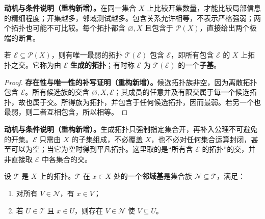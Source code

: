 \documentclass[../../main.tex]{subfiles}%
\begin{document}
\begin{remark}
\textbf{动机与条件说明（重构新增）。}在同一集合 $X$ 上比较开集数量，才能比较局部信息的精细程度；开集越多，邻域测试越多。包含关系允许相等，不表示严格强弱；两个拓扑也可能不可比较。每个拓扑都含 $\varnothing,X$ 且包含于 $\mathscr P(X)$，直接给出两个极端的断言。
\end{remark}
\begin{definition}[生成拓扑与子基]\label{definition:ch04-generated-topology}
若 $\mathcal E\subseteq\mathscr P(X)$，则有唯一最弱的拓扑 $\mathcal T(\mathcal E)$ 包含 $\mathcal E$，即所有包含 $\mathcal E$ 的 $X$ 上拓扑之交。它称为由 $\mathcal E$ \textbf{生成的拓扑}；有时称 $\mathcal E$ 为 $\mathcal T(\mathcal E)$ 的一个\textbf{子基}。
\end{definition}
\begin{proof}
\textbf{存在性与唯一性的补写证明（重构新增）。}候选拓扑族非空，因为离散拓扑包含 $\mathcal E$。所有候选族的交含 $\varnothing,X,\mathcal E$；其成员的任意并及有限交属于每一个候选拓扑，故也属于交。所得族为拓扑，并包含于任何候选拓扑，因而最弱。若另一个也最弱，则二者互相包含，所以相等。
\end{proof}
\begin{remark}
\textbf{动机与条件说明（重构新增）。}生成拓扑只强制指定集合开，再补入公理不可避免的开集。$\mathcal E$ 只需由 $X$ 的子集组成，不必覆盖 $X$，也不必对任何集合运算封闭，甚至可以为空；当它为空时得到平凡拓扑。这里取的是“所有含 $\mathcal E$ 的拓扑”的交，并非直接取 $\mathcal E$ 中各集合的交。
\end{remark}
\begin{definition}[邻域基]\label{definition:ch04-neighborhood-base}
设 $\mathcal T$ 是 $X$ 上的拓扑。$\mathcal T$ 在 $x\in X$ 处的一个\textbf{邻域基}是集合族 $\mathcal N\subseteq\mathcal T$，满足：
\begin{enumerate}
\item 对所有 $V\in\mathcal N$，有 $x\in V$；
\item 若 $U\in\mathcal T$ 且 $x\in U$，则存在 $V\in\mathcal N$ 使 $V\subseteq U$。
\end{enumerate}
\end{definition}
\end{document}
